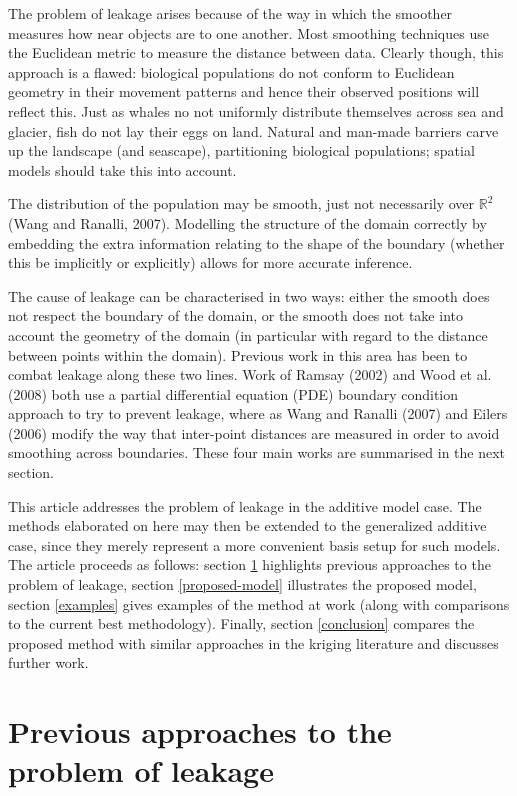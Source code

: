\documentclass[useAMS,referee, usegraphicx]{biom}
\begin{document}
The problem of leakage arises because of the way in which the smoother measures how near objects are to one another. Most smoothing techniques use the Euclidean metric to measure the distance between data. Clearly though, this approach is a flawed: biological populations do not conform to Euclidean geometry in their movement patterns and hence their observed positions will reflect this. Just as whales no not uniformly distribute themselves across sea and glacier, fish do not lay their eggs on land. Natural and man-made barriers carve up the landscape (and seascape), partitioning biological populations; spatial models should take this into account.

The distribution of the population may be smooth, just not necessarily over $\mathbb{R}^2$ (Wang and Ranalli, 2007). Modelling the structure of the domain correctly by embedding the extra information relating to the shape of the boundary (whether this be implicitly or explicitly) allows for more accurate inference.

The cause of leakage can be characterised in two ways: either the smooth does not respect the boundary of the domain, or the smooth does not take into account the geometry of the domain (in particular with regard to the distance between points within the domain). Previous work in this area has been to combat leakage along these two lines. Work of Ramsay (2002) and Wood et al. (2008) both use a partial differential equation (PDE) boundary condition approach to try to prevent leakage, where as Wang and Ranalli (2007) and Eilers (2006) modify the way that inter-point distances are measured in order to avoid smoothing across boundaries. These four main works are summarised in the next section.

This article addresses the problem of leakage in the additive model case. The methods elaborated on here may then be extended to the generalized additive case, since they merely represent a more convenient basis setup for such models. The article proceeds as follows: section \ref{previous-approaches} highlights previous approaches to the problem of leakage, section \ref{proposed-model} illustrates the proposed model, section \ref{examples} gives examples of the method at work (along with comparisons to the current best methodology). Finally, section \ref{conclusion} compares the proposed method with similar approaches in the kriging literature and discusses further work.

\section{Previous approaches to the problem of leakage}
\label{previous-approaches}
\end{document}
